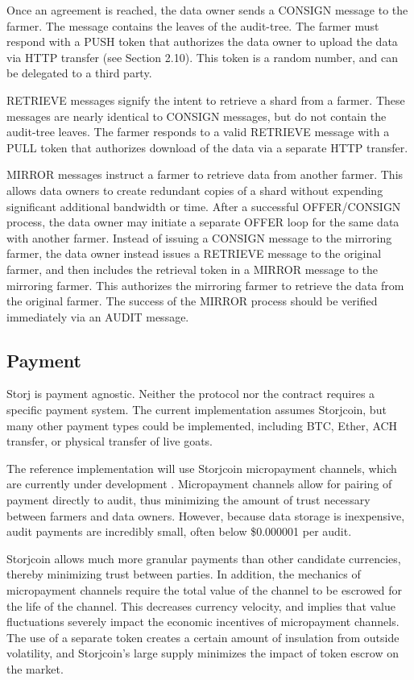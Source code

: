 \documentclass[a4paper,10pt]{article}
\begin{document}
Once an agreement is reached, the data owner sends a CONSIGN message to the farmer. The message contains the leaves of the audit-tree. The farmer must respond with a PUSH token that authorizes the data owner to upload the data via HTTP transfer (see Section 2.10). This token is a random number, and can be delegated to a third party.

RETRIEVE messages signify the intent to retrieve a shard from a farmer. These messages are nearly identical to CONSIGN messages, but do not contain the audit-tree leaves. The farmer responds to a valid RETRIEVE message with a PULL token that authorizes download of the data via a separate HTTP transfer.

MIRROR messages instruct a farmer to retrieve data from another farmer. This allows data owners to create redundant copies of a shard without expending significant additional bandwidth or time. After a successful OFFER/CONSIGN process, the data owner may initiate a separate OFFER loop for the same data with another farmer. Instead of issuing a CONSIGN message to the mirroring farmer, the data owner instead issues a RETRIEVE message to the original farmer, and then includes the retrieval token in a MIRROR message to the mirroring farmer. This authorizes the mirroring farmer to retrieve the data from the original farmer. The success of the MIRROR process should be verified immediately via an AUDIT message.

\subsection{Payment}
Storj is payment agnostic. Neither the protocol nor the contract requires a specific payment system. The current implementation assumes Storjcoin, but many other payment types could be implemented, including BTC, Ether, ACH transfer, or physical transfer of live goats.

The reference implementation will use Storjcoin micropayment channels, which are currently under development \cite{26}. Micropayment channels allow for pairing of payment directly to audit, thus minimizing the amount of trust necessary between farmers and data owners. However, because data storage is inexpensive, audit payments are incredibly small, often below \$0.000001 per audit.

Storjcoin allows much more granular payments than other candidate currencies, thereby minimizing trust between parties. In addition, the mechanics of micropayment channels require the total value of the channel to be escrowed for the life of the channel. This decreases currency velocity, and implies that value fluctuations severely impact the economic incentives of micropayment channels. The use of a separate token creates a certain amount of insulation from outside volatility, and Storjcoin's large supply minimizes the impact of token escrow on the market.
\end{document}
